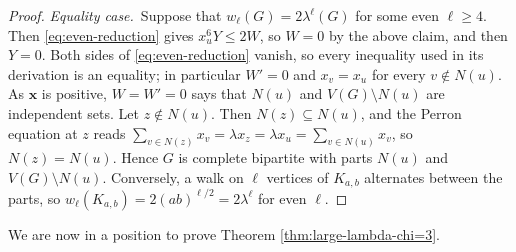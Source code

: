 \documentclass[11pt, a4paper]{article}
\theoremstyle{definition}
\theoremstyle{plain}
\renewcommand{\le}{\leqslant}
\renewcommand{\ge}{\geqslant}
\begin{document}
\begin{proof}
\smallskip
\noindent
\textit{Equality case.}\ Suppose that
$w_\ell (G)=2\lambda^{\ell}(G)$ for some even $\ell \ge 4$.
Then \eqref{eq:even-reduction} gives $x_u^{6}Y \le 2W$,
so $W=0$ by the above claim, and then $Y=0$. Both sides of
\eqref{eq:even-reduction} vanish, so every inequality
used in its derivation is an equality; in particular
$W'=0$ and $x_v=x_u$ for every $v\notin N(u)$. As $\bm{x}$
is positive, $W=W'=0$ says that $N(u)$ and $V(G)\setminus N(u)$ are independent sets. Let $z\notin N(u)$. Then
$N(z)\subseteq N(u)$, and the Perron equation at $z$ reads
$\sum_{v\in N(z)}x_v=\lambda x_z=\lambda x_u
=\sum_{v\in N(u)}x_v$, so $N(z)=N(u)$. Hence $G$ is complete
bipartite with parts $N(u)$ and $V(G)\! \setminus \! N(u)$.
Conversely, a walk on $\ell$ vertices of $K_{a,b}$
alternates between the parts, so
$w_\ell (K_{a,b})=2(ab)^{\ell /2}\! =2\lambda^{\ell}$ for
 even $\ell$.
\end{proof}


We are now in a position to prove Theorem
\ref{thm:large-lambda-chi=3}.
\end{document}
